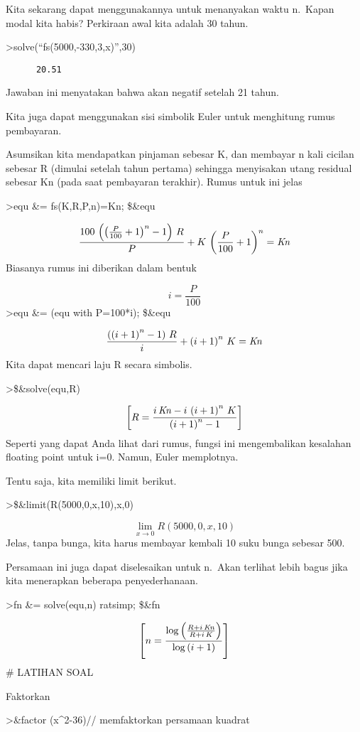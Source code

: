 \documentclass[
]{book}
\begin{document}
Kita sekarang dapat menggunakannya untuk menanyakan waktu n.~Kapan modal kita habis? Perkiraan awal kita adalah 30 tahun.

\textgreater solve(``fs(5000,-330,3,x)'',30)

\begin{verbatim}
      20.51 
\end{verbatim}

Jawaban ini menyatakan bahwa akan negatif setelah 21 tahun.

Kita juga dapat menggunakan sisi simbolik Euler untuk menghitung rumus pembayaran.

Asumsikan kita mendapatkan pinjaman sebesar K, dan membayar n kali cicilan sebesar R (dimulai setelah tahun pertama) sehingga menyisakan utang residual sebesar Kn (pada saat pembayaran terakhir). Rumus untuk ini jelas

\textgreater equ \&= fs(K,R,P,n)=Kn; \$\&equ

\[\frac{100\,\left(\left(\frac{P}{100}+1\right)^{n}-1\right)\,R}{P}+K\,\left(\frac{P}{100}+1\right)^{n}={\it Kn}\]Biasanya rumus ini diberikan dalam bentuk

\[i = \frac{P}{100}\]\textgreater equ \&= (equ with P=100*i); \$\&equ

\[\frac{\left(\left(i+1\right)^{n}-1\right)\,R}{i}+\left(i+1\right)^{n}\,K={\it Kn}\]Kita dapat mencari laju R secara simbolis.

\textgreater\$\&solve(equ,R)

\[\left[ R=\frac{i\,{\it Kn}-i\,\left(i+1\right)^{n}\,K}{\left(i+1\right)^{n}-1} \right]\]Seperti yang dapat Anda lihat dari rumus, fungsi ini mengembalikan kesalahan floating point untuk i=0. Namun, Euler memplotnya.

Tentu saja, kita memiliki limit berikut.

\textgreater\$\&limit(R(5000,0,x,10),x,0)

\[\lim_{x\rightarrow 0}{R\left(5000 , 0 , x , 10\right)}\]Jelas, tanpa bunga, kita harus membayar kembali 10 suku bunga sebesar 500.

Persamaan ini juga dapat diselesaikan untuk n.~Akan terlihat lebih bagus jika kita menerapkan beberapa penyederhanaan.

\textgreater fn \&= solve(equ,n) \textbar{} ratsimp; \$\&fn

\[\left[n=\frac{\log \left(\frac{R+i\,{\it Kn}}{R+i\,K}\right)}{\log \left(i+1\right)} \right]\] \# LATIHAN SOAL

Faktorkan

\textgreater\&factor (x\^{}2-36)// memfaktorkan persamaan kuadrat
\end{document}
